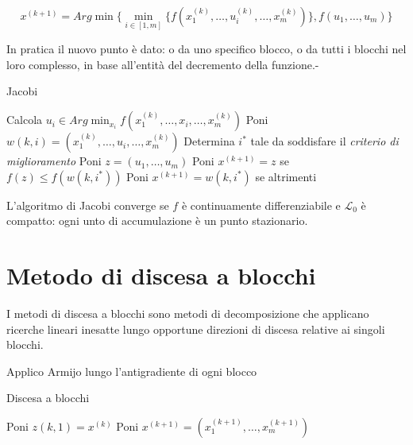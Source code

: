 \begin{equation}
  x^{(k+1)}=Arg\min\{\min_{i\in[1,m]}\{f(x_{1}^{(k)},\ldots,u_{i}^{(k)},\ldots,x_{m}^{(k)})\},f(u_{1},\ldots,u_{m})\}
\end{equation}

In pratica il nuovo punto è dato: o da uno specifico blocco, o da tutti i blocchi nel loro complesso, in base all'entità del decremento della funzione.-

\begin{algorithm}
  \label{alg:methods.decomposition.jacobi}
  \caption{Jacobi}

   {
     {
      Calcola
      $u_{i}\in Arg \min_{x_{i}} f(x_{1}^{(k)},\ldots,x_{i},\ldots,x_{m}^{(k)})$
      Poni
      $w(k,i)=(x_{1}^{(k)},\ldots,u_{i},\ldots,x_{m}^{(k)})$
    }
    Determina $i^{*}$ tale da soddisfare il \textit{criterio di miglioramento}
    Poni $z=(u_{1},\ldots,u_{m})$
    Poni $x^{(k+1)}=z$ se $f(z)\leq f(w(k,i^{*}))$
    Poni $x^{(k+1)}=w(k,i^{*})$ se altrimenti
  }
\end{algorithm}

L'algoritmo di Jacobi converge se $f$ è continuamente differenziabile e $\mathcal{L}_{0}$ è compatto: ogni unto di accumulazione è un punto stazionario.


\section{Metodo di discesa a blocchi}
\label{sec:methods.decomposition.descent-blocks}
I metodi di discesa a blocchi sono metodi di decomposizione che applicano ricerche lineari inesatte lungo opportune direzioni di discesa relative ai singoli blocchi.

Applico Armijo lungo l'antigradiente di ogni blocco

\begin{algorithm}
  \label{alg:methods.decomposition.descent-blocks}
  \caption{Discesa a blocchi}

   {
    Poni $z(k,1)=x^{(k)}$
    Poni $x^{(k+1)}=(x_{1}^{(k+1)},\ldots,x_{m}^{(k+1)})$
  }
\end{algorithm}

